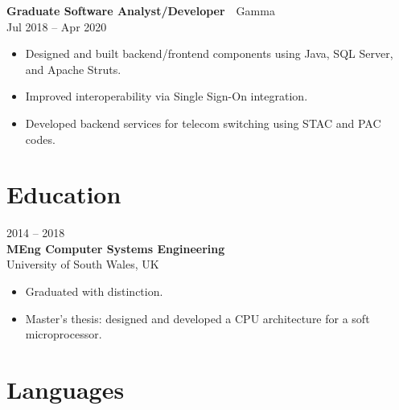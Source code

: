 \documentclass[11pt,a4paper]{moderncv}
\begin{document}
\begin{minipage}[c]{0.08\textwidth}
  \raggedleft
\end{minipage}%
\hspace{0.5em}%
\begin{minipage}[t]{0.9\textwidth}
  \textbf{Graduate Software Analyst/Developer} \,\textbullet\, {\color{mydarkblue}Gamma}\\
  {\footnotesize Jul 2018 -- Apr 2020}
  \begin{itemize}
    \item Designed and built backend/frontend components using Java, SQL Server, and Apache Struts.
    \item Improved interoperability via Single Sign-On integration.
    \item Developed backend services for telecom switching using STAC and PAC codes.
  \end{itemize}
\end{minipage}
\vspace{0.5em}

\begin{minipage}[t]{0.6\textwidth}
  \section{Education}
  \begin{minipage}[t]{0.13\textwidth}
    \raggedleft
  \end{minipage}%
  \hspace{0.3em}%
  \begin{minipage}[t]{0.9\textwidth}
    2014 -- 2018\\
    \textbf{MEng Computer Systems Engineering}\\
    University of South Wales, UK\\[-0.5em]
    \begin{itemize}
      \item Graduated with distinction.
      \item Master's thesis: designed and developed a CPU architecture for a soft microprocessor.
    \end{itemize}
  \end{minipage}
\end{minipage}%
\hfill
\begin{minipage}[t]{0.4\textwidth}
  \section{Languages}
\end{minipage}
\end{document}
